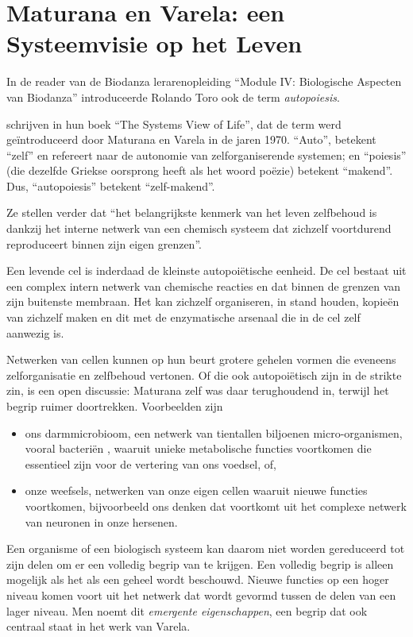 \documentclass[
  11pt,
]{book}
\begin{document}
\newpage

\section{Maturana en Varela: een Systeemvisie op het Leven}\label{maturanaVarela}

In de reader van de Biodanza lerarenopleiding ``Module IV: Biologische Aspecten van Biodanza'' introduceerde Rolando Toro ook de term \emph{autopoiesis}.

\citet{capraLuisi2014} schrijven in hun boek ``The Systems View of Life'', dat de term werd geïntroduceerd door Maturana en Varela in de jaren 1970. ``Auto'', betekent ``zelf'' en refereert naar de autonomie van zelforganiserende systemen; en ``poiesis'' (die dezelfde Griekse oorsprong heeft als het woord poëzie) betekent ``makend''. Dus, ``autopoiesis'' betekent ``zelf-makend''.

Ze stellen verder dat ``het belangrijkste kenmerk van het leven zelfbehoud is dankzij het interne netwerk van een chemisch systeem dat zichzelf voortdurend reproduceert binnen zijn eigen grenzen''.

Een levende cel is inderdaad de kleinste autopoiëtische eenheid. De cel bestaat uit een complex intern netwerk van chemische reacties en dat binnen de grenzen van zijn buitenste membraan. Het kan zichzelf organiseren, in stand houden, kopieën van zichzelf maken en dit met de enzymatische arsenaal die in de cel zelf aanwezig is.

Netwerken van cellen kunnen op hun beurt grotere gehelen vormen die eveneens zelforganisatie en zelfbehoud vertonen. Of die ook autopoiëtisch zijn in de strikte zin, is een open discussie: Maturana zelf was daar terughoudend in, terwijl \citet{capraLuisi2014} het begrip ruimer doortrekken. Voorbeelden zijn

\begin{itemize}
\item
  ons darmmicrobioom, een netwerk van tientallen biljoenen micro-organismen, vooral bacteriën \citep{Sender2016}, waaruit unieke metabolische functies voortkomen die essentieel zijn voor de vertering van ons voedsel, of,
\item
  onze weefsels, netwerken van onze eigen cellen waaruit nieuwe functies voortkomen, bijvoorbeeld ons denken dat voortkomt uit het complexe netwerk van neuronen in onze hersenen.
\end{itemize}

Een organisme of een biologisch systeem kan daarom niet worden gereduceerd tot zijn delen om er een volledig begrip van te krijgen. Een volledig begrip is alleen mogelijk als het als een geheel wordt beschouwd. Nieuwe functies op een hoger niveau komen voort uit het netwerk dat wordt gevormd tussen de delen van een lager niveau. Men noemt dit \emph{emergente eigenschappen}, een begrip dat ook centraal staat in het werk van Varela.
\end{document}
